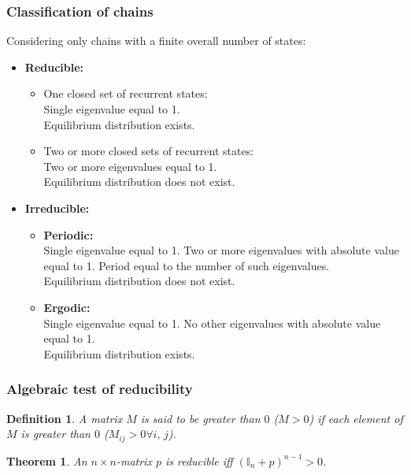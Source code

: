 \documentclass{article}
\newtheorem{theorem}{Theorem}
\newtheorem{definition}{Definition}
\begin{document}
\subsubsection{Classification of chains}
Considering only chains with a finite overall number of states:
\begin{itemize}
    \item \textbf{Reducible:} \begin{itemize}
        \item One closed set of recurrent states:\\ Single eigenvalue equal to 1. \\ Equilibrium distribution exists.
        \item Two or more closed sets of recurrent states:\\ Two or more eigenvalues equal to 1. \\ Equilibrium distribution does not exist.
    \end{itemize}
    \item \textbf{Irreducible:} \begin{itemize}
        \item \textbf{Periodic:}\\ Single eigenvalue equal to 1. Two or more eigenvalues with absolute value equal to 1. Period equal to the number of such eigenvalues. \\ Equilibrium distribution does not exist.
        \item \textbf{Ergodic:}\\ Single eigenvalue equal to 1. No other eigenvalues with absolute value equal to 1. \\ Equilibrium distribution exists.
    \end{itemize}
\end{itemize}
\subsubsection{Algebraic test of reducibility}
\begin{definition}
    A matrix $M$ is said to be greater than $0$ ($M>0$) if each element of $M$ is greater than $0$ ($ M_{ij}>0\forall i,\,j $).
\end{definition}
\begin{theorem}
    An $n\times n$-matrix $p$ is reducible iff $(\mathbb{I}_n + p)^{n-1}>0$.
\end{theorem}
\end{document}
